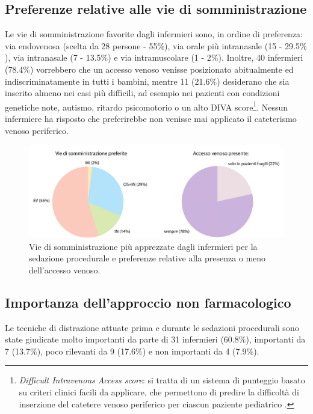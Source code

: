 \newpage

\subsection*{Preferenze relative alle vie di somministrazione}

Le vie di somministrazione favorite dagli infermieri sono, in ordine di preferenza: via endovenosa (scelta da 28 persone - 55$\%$), via orale più intranasale (15 - 29.5$\%$), via intranasale (7 - 13.5$\%$) e via intramuscolare (1 - 2$\%$). Inoltre, 40 infermieri (78.4$\%$) vorrebbero che un accesso venoso venisse posizionato abitualmente ed indiscriminatamente in tutti i bambini, mentre 11 (21.6$\%$) desiderano che sia inserito almeno nei casi più difficili, ad esempio nei pazienti con condizioni genetiche note, autismo, ritardo psicomotorio o un alto DIVA score\footnote{\emph{Difficult Intravenous Access score}: si tratta di un sistema di punteggio basato su criteri clinici facili da applicare, che permettono di predire la difficoltà di inserzione del catetere venoso periferico per ciascun paziente pediatrico \cite{Yen2008}.}. Nessun infermiere ha risposto che preferirebbe non venisse mai applicato il cateterismo venoso periferico. 

\begin{figure}[!h]
    \centering
    \includegraphics[width=1\textwidth]{Figure/sommicrosoftchiaro.pdf}
    \caption{Vie di somministrazione più apprezzate dagli infermieri per la sedazione procedurale e preferenze relative alla presenza o meno dell'accesso venoso.}
    \label{fig:viedisomm}
\end{figure}


\subsection*{Importanza dell'approccio non farmacologico}

Le tecniche di distrazione attuate prima e durante le sedazioni procedurali sono state giudicate molto importanti da parte di 31 infermieri (60.8$\%$), importanti da 7 (13.7$\%$), poco rilevanti da 9 (17.6$\%$) e non importanti da 4 (7.9$\%$).

